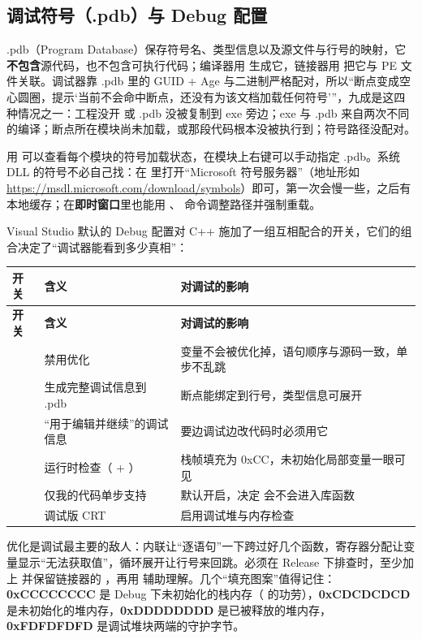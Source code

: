 \subsection{调试符号（.pdb）与 Debug 配置}

.pdb（Program Database）保存符号名、类型信息以及源文件与行号的映射，它\textbf{不包含}源代码，也不包含可执行代码；编译器用  生成它，链接器用  把它与 PE 文件关联。调试器靠 .pdb 里的 GUID + Age 与二进制严格配对，所以“断点变成空心圆圈，提示‘当前不会命中断点，还没有为该文档加载任何符号’”，九成是这四种情况之一：工程没开  或 .pdb 没被复制到 exe 旁边；exe 与 .pdb 来自两次不同的编译；断点所在模块尚未加载，或那段代码根本没被执行到；符号路径没配对。

用  可以查看每个模块的符号加载状态，在模块上右键可以手动指定 .pdb。系统 DLL 的符号不必自己找：在  里打开“Microsoft 符号服务器”（地址形如 \url{https://msdl.microsoft.com/download/symbols}）即可，第一次会慢一些，之后有本地缓存；在\textbf{即时窗口}里也能用 、 命令调整路径并强制重载。

Visual Studio 默认的 Debug 配置对 C++ 施加了一组互相配合的开关，它们的组合决定了“调试器能看到多少真相”：

\begin{longtable}{L{2.0cm}L{5.4cm}L{7.2cm}}\toprule
\textbf{开关} & \textbf{含义} & \textbf{对调试的影响} \\ \midrule \endfirsthead
\toprule \textbf{开关} & \textbf{含义} & \textbf{对调试的影响} \\ \midrule \endhead \bottomrule \endlastfoot
{} & 禁用优化 & 变量不会被优化掉，语句顺序与源码一致，单步不乱跳 \\
 & 生成完整调试信息到 .pdb & 断点能绑定到行号，类型信息可展开 \\
 & “用于编辑并继续”的调试信息 & 要边调试边改代码时必须用它 \\
 & 运行时检查（ + ） & 栈帧填充为 0xCC，未初始化局部变量一眼可见 \\
 & 仅我的代码单步支持 & 默认开启，决定  会不会进入库函数 \\
 & 调试版 CRT & 启用调试堆与内存检查 \\
\end{longtable}
优化是调试最主要的敌人：内联让“逐语句”一下跨过好几个函数，寄存器分配让变量显示“无法获取值”，循环展开让行号来回跳。必须在 Release 下排查时，至少加上  并保留链接器的 ，再用  辅助理解。几个“填充图案”值得记住：\textbf{0xCCCCCCCC} 是 Debug 下未初始化的栈内存（ 的功劳），\textbf{0xCDCDCDCD} 是未初始化的堆内存，\textbf{0xDDDDDDDD} 是已被释放的堆内存，\textbf{0xFDFDFDFD} 是调试堆块两端的守护字节。


